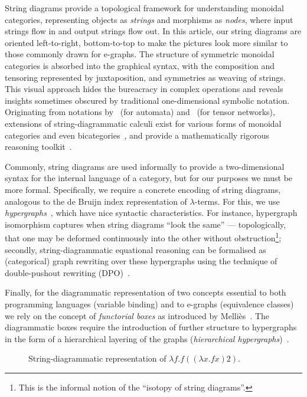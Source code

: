 String diagrams provide a topological framework for understanding monoidal categories, representing objects as \emph{strings} and morphisms as \emph{nodes}, where input strings flow in and output strings flow out.
In this article, our string diagrams are oriented left-to-right, bottom-to-top to make the pictures look more similar to those commonly drawn for e-graphs.
The structure of symmetric monoidal categories is absorbed into the graphical syntax, with the composition and tensoring represented by juxtaposition, and symmetries as weaving of strings.
This visual approach hides the bureacracy in complex operations and reveals insights sometimes obscured by traditional one-dimensional symbolic notation.
Originating from notations by~\citet{hotzsd} (for automata) and~\citet{penrose1984spinors} (for tensor networks), extensions of string-diagrammatic calculi exist for various forms of monoidal categories and even bicategories~\cite{Selinger_2010}, and provide a mathematically rigorous reasoning toolkit~\cite{joyal_geometry_1991}.

Commonly, string diagrams are used informally to provide a two-dimensional syntax for the internal language of a category, but for our purposes we must be more formal.
Specifically, we require a concrete encoding of string diagrams, analogous to the de Bruijn index representation of $\lambda$-terms.
For this, we use \emph{hypergraphs}~\cite{bonchi_string_2022-1}, which have nice syntactic characteristics.
For instance, hypergraph isomorphism captures when string diagrams \enquote{look the same} --- topologically, that one may be deformed continuously into the other without obstruction\footnote{This is the informal notion of the \enquote{isotopy of string diagrams}.}; secondly, string-diagrammatic equational reasoning can be formalised as (categorical) graph rewriting over these hypergraphs using the technique of double-pushout rewriting (DPO)~\cite{bonchi_string_2022-1}.

Finally, for the diagrammatic representation of two concepts essential to both programming languages (variable binding) and to e-graphs (equivalence classes) we rely on the concept of \emph{functorial boxes} as introduced by Melli\`es~\cite{10.1007/11874683_1}.
The diagrammatic boxes require the introduction of further structure to hypergraphs in the form of a hierarchical layering of the graphs (\emph{hierarchical hypergraphs})~\cite{fscd}.

\begin{figure}
	\centering
	\caption{String-diagrammatic representation of $\lambda f . f ((\lambda x . f x) 2)$.}\label{fig:de-brujin-string}
\end{figure}

